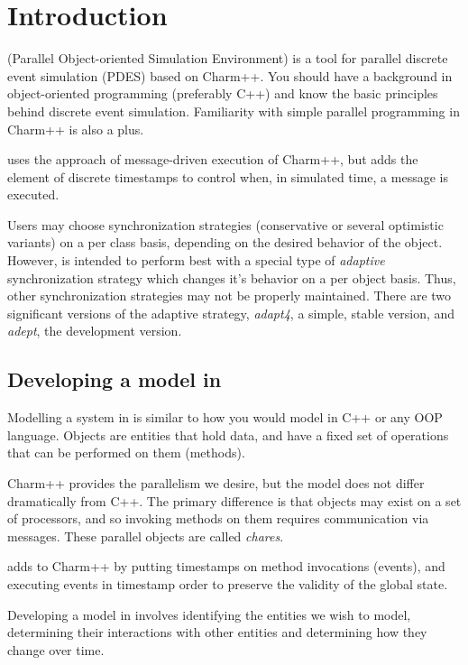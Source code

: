 \section{Introduction}

\pose{} (Parallel Object-oriented Simulation Environment) is a tool for
parallel discrete event simulation (PDES) based on Charm++.  You should have
a background in object-oriented programming (preferably C++) and know the
basic principles behind discrete event simulation. Familiarity
with simple parallel programming in Charm++ is also a plus.  

\pose{} uses the approach of message-driven execution of Charm++, but
adds the element of discrete timestamps to control when, in simulated
time, a message is executed.

Users may choose synchronization strategies (conservative or several
optimistic variants) on a per class basis, depending on the desired
behavior of the object.  However, \pose{} is intended to perform best
with a special type of {\it adaptive} synchronization strategy which
changes it's behavior on a per object basis.  Thus, other
synchronization strategies may not be properly maintained.  There are
two significant versions of the adaptive strategy, {\sl adapt4}, a
simple, stable version, and {\sl adept}, the development version.

\subsection{Developing a model in \pose{}}

Modelling a system in \pose{} is similar to how you would model in C++ or
any OOP language.  Objects are entities that hold data, and have a
fixed set of operations that can be performed on them (methods).

Charm++ provides the parallelism we desire, but the model does not
differ dramatically from C++.  The primary difference is that objects
may exist on a set of processors, and so invoking methods on them
requires communication via messages.  These parallel objects are
called {\it chares}.

\pose{} adds to Charm++ by putting timestamps on method invocations
(events), and executing events in timestamp order to preserve the
validity of the global state.

Developing a model in \pose{} involves identifying the entities we
wish to model, determining their interactions with other entities and
determining how they change over time.

